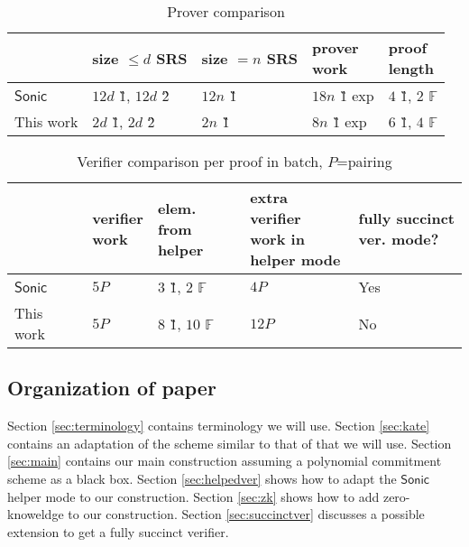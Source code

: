\documentclass[11pt]{article}
\numberwithin{figure}{section} %
\newcommand{\F}{\ensuremath{\mathbb F}\xspace}
\newcommand{\sonic}{\ensuremath{\mathsf{Sonic}}\xspace}
\begin{document}
\begin{table}[ht]
\caption{Prover comparison}
\centering
\begin{tabular}{l|l|l|l|l}
                     & \thead{size $\leq d$\\ SRS} & \thead{size $=n$\\ SRS} & \thead{prover\\ work} & \thead{proof\\ length}  \\ \hline
\sonic           &  $12d$ \G1, $12d$ \G2 &   $12n$ \G1    &   $18n$ \G1 exp &  $4$ \G1, $2$ $\F$             \\        \hline
This work &  $2d$ \G1, $2d$ \G2  &      $2n$ \G1  &   $8n$ \G1 exp  &   $6$ \G1, $4$ \F     \\     \hline
\end{tabular}
\end{table}


 \begin{table}[ht]
 \caption{Verifier comparison per proof in batch, $P$=pairing}
\centering
 \begin{tabular}{l|l|l|l|l}
                      &  \thead{verifier\\ work} & \thead{elem. from\\ helper} & \thead{extra verifier \\ work in\\ helper mode} &\thead{fully succinct\\ ver. mode?}\\ \hline
 \sonic           &   $5P$  &  $3$ \G1, $2$ \F  & $4P$ & Yes         \\        \hline
 This work &  $5P$  &  $8$ \G1, $10$ \F & $12P$  & No \\     \hline
 \end{tabular}
 \end{table}
 

 \subsection{Organization of paper}
 Section \ref{sec:terminology} contains terminology we will use. Section \ref{sec:kate} contains an adaptation of the \cite{kate} scheme similar to that of \cite{sonic} that we will use. Section \ref{sec:main} contains our main construction assuming a polynomial commitment scheme as a black box.
 Section \ref{sec:helpedver} shows how to adapt the \sonic helper mode to our construction. Section \ref{sec:zk} shows how to add zero-knoweldge to our construction. Section \ref{sec:succinctver} discusses a possible extension to get a fully succinct verifier.
 
\end{document}
